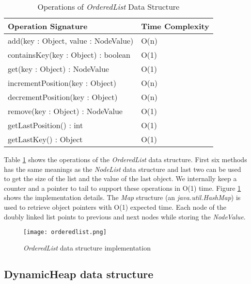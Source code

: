 \begin{table}
\centering
\caption{Operations of \textit{OrderedList} Data Structure}
\begin{tabular}{|l|l|} \hline
Operation Signature & Time Complexity \\ \hline \hline
add(key : Object, value : NodeValue) & O(n) \\ \hline
containsKey(key : Object) : boolean & O(1) \\ \hline
get(key : Object) : NodeValue & O(1) \\ \hline
incrementPosition(key : Object) & O(n) \\ \hline
decrementPosition(key : Object) & O(n) \\ \hline
remove(key : Object) : NodeValue & O(1) \\ \hline
getLastPosition() : int & O(1) \\ \hline
getLastKey() : Object & O(1) \\ \hline
\end{tabular}
\label{orderedlist_api}
\end{table}

Table \ref{orderedlist_api} shows the operations of the \textit{OrderedList} data structure. First six methods has the same meanings as the \textit{NodeList} data structure and last two can be used to get the size of the list and the value of the last object. We internally keep a counter and a pointer to tail to support these operations in O(1) time. Figure \ref{orderedlist_impl} shows the implementation details. The \textit{Map} structure (an \textit{java.util.HashMap}) is used to retrieve object pointers with O(1) expected time. Each node of the doubly linked list points to previous and next nodes while storing the \textit{NodeValue}.


\begin{figure}[!t]
        \centering
        \texttt{[image: orderedlist.png]}
        \caption{\textit{OrderedList} data structure implementation}
        \label{orderedlist_impl}
\end{figure}

\subsection{DynamicHeap data structure}

